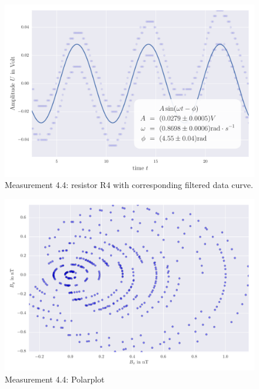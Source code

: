 \begin{figure}[H]
    \centering
    \includegraphics[width=0.7\linewidth]{analysis/figures/fit4_4}
    \caption{Measurement 4.4: resistor R4 with corresponding filtered data curve.}
    \label{fig:4_4_plot}
\end{figure}
\begin{figure}[H]
    \centering
    \includegraphics[width=0.7\linewidth]{analysis/figures/polar4_4}
    \caption{Measurement 4.4: Polarplot}
    \label{fig:4_4_polar}
\end{figure}

